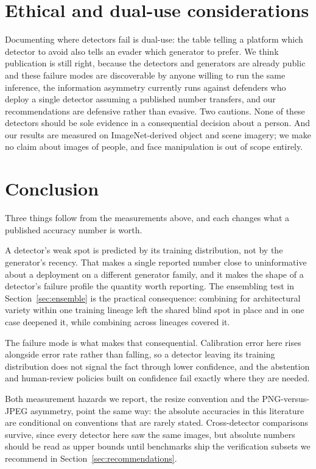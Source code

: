 \documentclass[3p,times,procedia]{elsarticle}
\begin{document}
\section{Ethical and dual-use considerations}
\label{sec:ethics}

Documenting where detectors fail is dual-use: the table telling a platform
which detector to avoid also tells an evader which generator to prefer. We
think publication is still right, because the detectors and generators are
already public and these failure modes are discoverable by anyone willing
to run the same inference, the information asymmetry currently runs
against defenders who deploy a single detector assuming a published number
transfers, and our recommendations are defensive rather than evasive. Two
cautions. None of these detectors should be sole evidence in a
consequential decision about a person. And our results are measured on
ImageNet-derived object and scene imagery; we make no claim about images
of people, and face manipulation is out of scope entirely.


\section{Conclusion}
\label{sec:conclusion}

Three things follow from the measurements above, and each changes what a
published accuracy number is worth.

A detector's weak spot is predicted by its training distribution, not by
the generator's recency. That makes a single reported number close to
uninformative about a deployment on a different generator family, and it
makes the shape of a detector's failure profile the quantity worth
reporting. The ensembling test in Section~\ref{sec:ensemble} is the
practical consequence: combining for architectural variety within one
training lineage left the shared blind spot in place and in one case
deepened it, while combining across lineages covered it.

The failure mode is what makes that consequential. Calibration error here
rises alongside error rate rather than falling, so a detector leaving its
training distribution does not signal the fact through lower confidence,
and the abstention and human-review policies built on confidence fail
exactly where they are needed.

Both measurement hazards we report, the resize convention and the
PNG-versus-JPEG asymmetry, point the same way: the absolute accuracies in
this literature are conditional on conventions that are rarely stated.
Cross-detector comparisons survive, since every detector here saw the same
images, but absolute numbers should be read as upper bounds until
benchmarks ship the verification subsets we recommend in
Section~\ref{sec:recommendations}.
\end{document}
